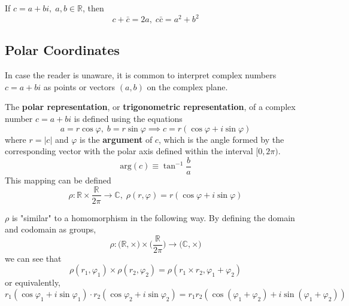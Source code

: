   If $c = a + b i, \; a, b \in \mathbb{R}$, then 
  \begin{equation}
    c + \bar{c} = 2a, \; c \bar{c} = a^2 + b^2
  \end{equation}

\subsection{Polar Coordinates}

  In case the reader is unaware, it is common to interpret complex numbers $c = a + b i$ as points or vectors $(a, b)$ on the complex plane. 

  \begin{definition}
    The \textbf{polar representation}, or \textbf{trigonometric representation}, of a complex number $c = a + b i$ is defined using the equations 
    \begin{equation}
      a = r \cos{\varphi}, \; b = r\sin{\varphi} \implies c = r (\cos{\varphi} + i \sin{\varphi})
    \end{equation}
    where $r = |c|$ and $\varphi$ is the \textbf{argument} of $c$, which is 
    the angle formed by the corresponding vector with the polar axis defined within the interval $[0, 2\pi)$. 
    \begin{equation}
      \text{arg}(c) \equiv \tan^{-1}{\frac{b}{a}}
    \end{equation}
    This mapping can be defined 
    \begin{equation}
      \rho: \mathbb{R} \times \frac{\mathbb{R}}{2 \pi} \longrightarrow \mathbb{C}, \; \rho(r, \varphi) = r (\cos{\varphi} + i \sin{\varphi})
    \end{equation}
  \end{definition}

  \begin{theorem}
    $\rho$ is "similar" to a homomorphism in the following way. By defining the domain and codomain as groups, 
    \begin{equation}
      \rho: \big( \mathbb{R}, \times \big) \times \Big( \frac{\mathbb{R}}{2 \pi} \Big) \longrightarrow \big( \mathbb{C}, \times \big)
    \end{equation}
    we can see that
    \begin{equation}
      \rho (r_1, \varphi_1) \times \rho(r_2, \varphi_2) = \rho(r_1 \times r_2, \varphi_1 + \varphi_2) 
    \end{equation}
    or equivalently, 
    \begin{equation}
      r_1 (\cos{\varphi_1} + i \sin{\varphi_1}) \cdot r_2 (\cos{\varphi_2} + i \sin{\varphi_2}) = r_1 r_2 (\cos{(\varphi_1 + \varphi_2)} + i \sin{(\varphi_1 + \varphi_2)})
    \end{equation}
  \end{theorem}

